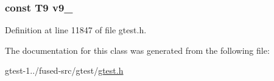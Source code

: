 \hypertarget{classtesting_1_1internal_1_1ValueArray31_a6356e16cf54a9dfac8525f20242af31e}{
\subsubsection[{v9\-\_\-}]{\setlength{\rightskip}{0pt plus 5cm}const \-T9 {\bf v9\-\_\-}}}\label{dd/d05/classtesting_1_1internal_1_1ValueArray31_a6356e16cf54a9dfac8525f20242af31e}


\-Definition at line 11847 of file gtest.\-h.



\-The documentation for this class was generated from the following file\-:\begin{DoxyCompactItemize}
\item 
gtest-\/1../fused-\/src/gtest/\hyperlink{fused-src_2gtest_2gtest_8h}{gtest.\-h}\end{DoxyCompactItemize}
